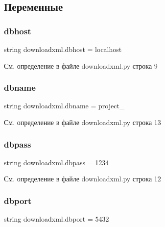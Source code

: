 \subsection{Переменные}
\mbox{\label{namespacedownloadxml_a75453296d7099653f232694ed5824b3f}} 
\subsubsection{\texorpdfstring{dbhost}{dbhost}}
{\footnotesize\ttfamily string downloadxml.\+dbhost = \textquotesingle{}localhost\textquotesingle{}}



См. определение в файле downloadxml.\+py строка 9

\mbox{\label{namespacedownloadxml_ab0bd228b1313bba2e1fe1caa883e5b6c}} 
\subsubsection{\texorpdfstring{dbname}{dbname}}
{\footnotesize\ttfamily string downloadxml.\+dbname = \textquotesingle{}project\+\_\textquotesingle{}}



См. определение в файле downloadxml.\+py строка 13

\mbox{\label{namespacedownloadxml_af527b05230cf500f27f1a899351d60af}} 
\subsubsection{\texorpdfstring{dbpass}{dbpass}}
{\footnotesize\ttfamily string downloadxml.\+dbpass = \textquotesingle{}1234\textquotesingle{}}



См. определение в файле downloadxml.\+py строка 12

\mbox{\label{namespacedownloadxml_a32bdf9e8d022578666b5b9993714c4ef}} 
\subsubsection{\texorpdfstring{dbport}{dbport}}
{\footnotesize\ttfamily string downloadxml.\+dbport = \textquotesingle{}5432\textquotesingle{}}



